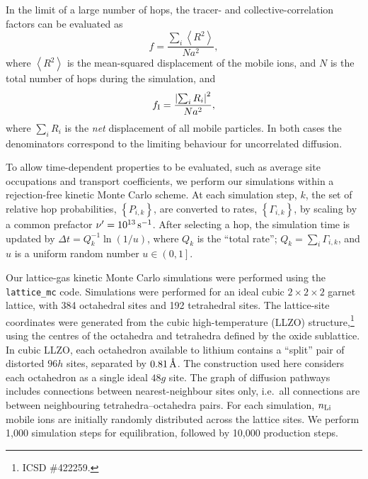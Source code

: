 \documentclass[aps,prb,twocolumn,superscriptaddress,reprint]{revtex4-1}
\newcommand{\set}[1]{\left\{#1\right\}}
\newcommand{\angstrom}{\mbox{\normalfont\AA}}
\begin{document}
In the limit of a large number of hops, the tracer- and collective-correlation factors can be evaluated as
\begin{equation}
  f = \frac{\sum_i\left<R^2\right>}{Na^2},
  \label{eqn:tracer_correlation_factor}
\end{equation}
where $\left<R^2\right>$ is the mean-squared displacement of the mobile ions, and $N$ is the total number of hops during the simulation,\cite{VanDerVenEtAl_PhysRevB2001} and
\begin{equation}
  f_{\mathrm{I}} = \frac{\left|\sum_i R_i\right|^2}{Na^2},
  \label{eqn:collective_correlation_factor}
\end{equation}
where $\sum_i R_i$ is the \emph{net} displacement of all mobile particles. 
In both cases the denominators correspond to the limiting behaviour for uncorrelated diffusion.

To allow time-dependent properties to be evaluated, such as average site occupations and transport coefficients, we perform our simulations within a rejection-free kinetic Monte Carlo scheme.\cite{Voter_RadiationEffectsInSolids2007} 
At each simulation step, $k$, the set of relative hop probabilities, $\set{P_{i,k}}$, are converted to rates, $\set{\Gamma_{i,k}}$, by scaling by a common prefactor $\nu^\prime=10^{13}\,\mathrm{s}^{-1}$. 
After selecting a hop, the simulation time is updated by $\Delta t = Q_k^{-1}\ln\left(1/u\right)$, where $Q_k$ is the ``total rate''; $Q_k=\sum_i \Gamma_{i,k}$, and $u$ is a uniform random number $u\in\left(0,1\right]$. 

Our lattice-gas kinetic Monte Carlo simulations were performed using the \texttt{lattice\_mc} code.\cite{Morgan_JOSS2017} 
Simulations were performed for an ideal cubic $2\times2\times2$ garnet lattice, with 384 octahedral sites and 192 tetrahedral sites. 
The lattice-site coordinates were generated from the cubic high-temperature  (LLZO) structure,\footnote{ICSD \#422259.\cite{AwakaEtAl_ChemLett2011}} using the centres of the octahedra and tetrahedra defined by the oxide sublattice. 
In cubic LLZO, each octahedron available to lithium contains a ``split'' pair of distorted $96h$ sites, separated by $0.81\u{\angstrom}$. 
The construction used here considers each octahedron as a single ideal $48g$ site. 
The graph of diffusion pathways includes connections between nearest-neighbour sites only, i.e.\ all connections are between neighbouring tetrahedra--octahedra pairs. For each simulation, $n_{\mathrm{Li}}$ mobile ions are initially randomly distributed across the lattice sites. We perform 1,000 simulation steps for equilibration, followed by 10,000 production steps. 
\end{document}

